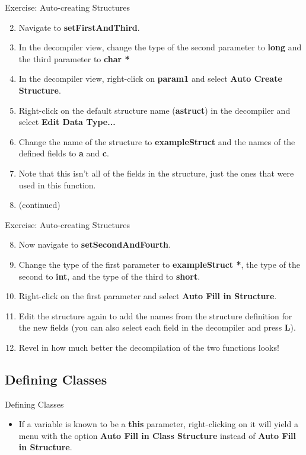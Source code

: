 \documentclass{beamer}
\begin{document}
\begin{frame}
\begin{block}{Exercise: Auto-creating Structures}
\begin{enumerate}
\setcounter{enumi}{1}
\item Navigate to \textbf{setFirstAndThird}. 
\item In the decompiler view, change the type of the second parameter to \textbf{long} and the third parameter to \textbf{char *}
\item In the decompiler view, right-click on \textbf{param1} and select \textbf{Auto Create Structure}.
\item Right-click on the default structure name (\textbf{astruct}) in the decompiler and select \textbf{Edit Data Type...}
\item Change the name of the structure to \textbf{exampleStruct} and the names of the defined fields to \textbf{a} and \textbf{c}.
\item Note that this isn't all of the fields in the structure, just the ones that were used in this function.
\item[] (continued)
\end{enumerate}
\end{block}
\end{frame}

\begin{frame}
\begin{block}{Exercise: Auto-creating Structures}
\begin{enumerate}
\setcounter{enumi}{7}
\item Now navigate to \textbf{setSecondAndFourth}.
\item Change the type of the first parameter to \textbf{exampleStruct *}, the type of the second to \textbf{int}, and the type of the third to \textbf{short}.
\item Right-click on the first parameter and select \textbf{Auto Fill in Structure}.
\item Edit the structure again to add the names from the structure definition for the new fields (you can also select each field in the decompiler and press \textbf{L}).
\item Revel in how much better the decompilation of the two functions looks!
\end{enumerate}
\end{block}
\end{frame}

\subsection{Defining Classes}
\begin{frame}
\begin{block}{Defining Classes}
\begin{itemize}
\item If a variable is known to be a \textbf{this} parameter, right-clicking on it will yield a menu with the option \textbf{Auto Fill in Class Structure} instead 
of \textbf{Auto Fill in Structure}.
\end{itemize}
\end{block}
\end{frame}
\end{document}
